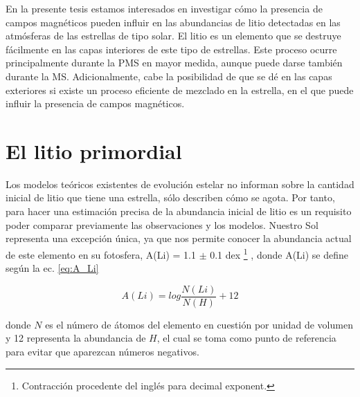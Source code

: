 En la presente tesis estamos interesados en investigar cómo la presencia de campos magnéticos pueden influir en las abundancias de litio detectadas en las atmósferas de las estrellas de tipo solar. El litio es un elemento que se destruye fácilmente en las capas interiores de este tipo de estrellas. Este proceso ocurre principalmente durante la PMS en mayor medida, aunque puede darse también durante la MS. Adicionalmente, cabe la posibilidad de que se dé en las capas exteriores si existe un proceso eficiente de mezclado en la estrella, en el que puede influir la presencia de campos magnéticos.\par

\section{El litio primordial}
Los modelos teóricos existentes de evolución estelar no informan sobre la cantidad inicial de litio que tiene una estrella, sólo describen cómo se agota. Por tanto, para hacer una estimación precisa de la abundancia inicial de litio es un requisito poder comparar previamente las observaciones y los modelos. Nuestro Sol representa una excepción única, ya que nos permite conocer la abundancia actual de este elemento en su fotosfera, A(Li) = 1.1 $\pm$ 0.1 dex \footnote{Contracción procedente del inglés para decimal exponent.} \citep{Jeffries2004}, donde A(Li) se define según la ec. \ref{eq:A_Li}

\begin{ceqn}
	\begin{equation}
		A(Li) = log\frac{N(Li)}{N(H)} + 12
		\label{eq:A_Li}
	\end{equation}
\end{ceqn}

donde $N$ es el número de átomos del elemento en cuestión por unidad de volumen y 12 representa la abundancia de $H$, el cual se toma como punto de referencia para evitar que aparezcan números negativos.\par

